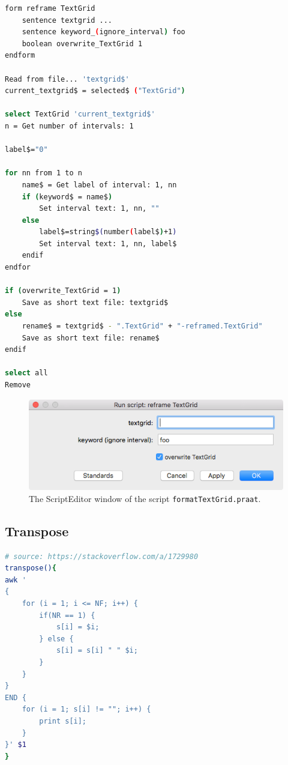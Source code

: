 \documentclass{book}
\begin{document}
\begin{lstlisting}[language=bash]
form reframe TextGrid
    sentence textgrid ...
	sentence keyword_(ignore_interval) foo
	boolean overwrite_TextGrid 1
endform

Read from file... 'textgrid$'
current_textgrid$ = selected$ ("TextGrid")

select TextGrid 'current_textgrid$'
n = Get number of intervals: 1

label$="0"

for nn from 1 to n
	name$ = Get label of interval: 1, nn
	if (keyword$ = name$)
		Set interval text: 1, nn, ""
	else
		label$=string$(number(label$)+1)
		Set interval text: 1, nn, label$
	endif
endfor

if (overwrite_TextGrid = 1)
	Save as short text file: textgrid$
else	
	rename$ = textgrid$ - ".TextGrid" + "-reframed.TextGrid"
	Save as short text file: rename$
endif

select all
Remove
\end{lstlisting}

\makeatletter
\setlength{\@fptop}{0pt}
\makeatother

\begin{figure}[!hbt]
	\begin{center}
		\includegraphics[scale=0.5]{img/7861}
		\caption{The ScriptEditor window of the script \texttt{formatTextGrid.praat}.}
		\label{fig:ftg}
	\end{center}
\end{figure}

\subsection{Transpose}
\label{trans}
\begin{lstlisting}[language=bash]
# source: https://stackoverflow.com/a/1729980
transpose(){
awk '
{
    for (i = 1; i <= NF; i++) {
        if(NR == 1) {
            s[i] = $i;
        } else {
            s[i] = s[i] " " $i;
        }
    }
}
END {
    for (i = 1; s[i] != ""; i++) {
        print s[i];
    }
}' $1
}
\end{lstlisting}
\end{document}
